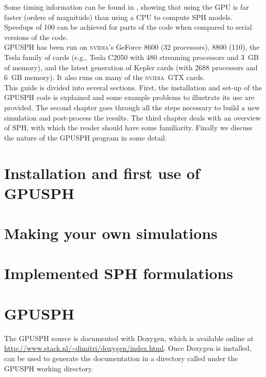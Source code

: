 \documentclass[12pt]{memoir}
\newcommand{\nvidia}{\textsc{nvidia}}
\begin{document}
Some timing information can be found in \cite{herault_sph_2010}, 
showing that using the GPU is far faster (orders
of magnitude) than using a CPU to compute SPH models. Speedups of 100
can be achieved for parts of the code when compared to serial versions
of the code.\\

GPUSPH has been run on \nvidia's GeForce 8600 (32 processors), 8800
(110), the Tesla family of cards (e.g., Tesla C2050 with 480 streaming
processors and 3~GB of memory), and the latest generation of Kepler
cards (with 2688 processors and 6~GB memory). It also runs on many of
the \nvidia\ GTX cards.\\

This guide is divided into several sections. 
First, the installation and set-up of the GPUSPH code is explained and 
some example problems to illustrate its use are provided.
The second chapter goes through all the steps necessary to build a new
simulation and post-process the results.
The third chapter deals with an overview of SPH, with which the reader should
have some familiarity. 
Finally we discuss the nature of the GPUSPH program in some detail.

\chapter{Installation and first use of GPUSPH}


\chapter{Making your own simulations}


\chapter{Implemented SPH formulations}


\iffalse
\chapter{GPUSPH}

The GPUSPH source is documented with Doxygen, which is available online
at \url{http://www.stack.nl/~dimitri/doxygen/index.html}. Once Doxygen
is installed,  can be used to generate the documentation
in a directory called  under the GPUSPH working directory.
\end{document}
